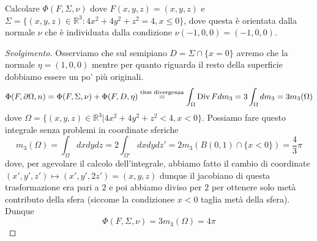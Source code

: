 \begin{example}
	Calcolare $\Phi(F, \Sigma, \nu)$ dove $F(x, y, z)=(x, y, z)$ e $\Sigma=\{(x, y, z) \in \mathbb{R}^3 : 4x^2 + 4y^2 + z^2 = 4, x \leq 0 \}$, dove questa è orientata dalla normale $\nu$ che è individuata dalla condizione
	$\nu(-1, 0, 0) = (-1, 0, 0)$.
\end{example}
\begin{proof}[Svolgimento]
	Osserviamo che sul semipiano $D = \Sigma \cap \{x = 0\}$ avremo che la normale $\eta = (1, 0, 0)$ mentre per quanto riguarda il resto della superficie dobbiamo essere un po' più originali.
	$$
	\Phi(F, \partial \Omega, n) = \Phi(F, \Sigma, \nu) + \Phi(F, D, \eta) \stackrel{\text{thm divergenza}}{=} \int_\Omega \operatorname{Div} F dm_3 = 3\int_\Omega dm_3 = 3m_3(\Omega) 
	$$
	dove $\Omega = \{(x, y, z) \in \mathbb{R}^3 | 4x^2 + 4y^2 + z^2 < 4, x < 0 \}$. Possiamo fare questo integrale senza problemi in coordinate sferiche
	$$
	m_3(\Omega) = \int_\Omega dxdydz = 2 \int_{\Omega'} dxdydz' = 2 m_3(B(0, 1) \cap \{ x < 0 \})= \frac{4}{3} \pi 
	$$
	dove, per agevolare il calcolo dell'integrale, abbiamo fatto il cambio di coordinate $(x', y', z') \mapsto (x', y', 2z') = (x, y, z)$ dunque il jacobiano di questa trasformazione era pari a $2$ e poi abbiamo diviso per $2$ per ottenere solo metà contributo della sfera (siccome la condizionee $x<0$ taglia metà della sfera).
	Dunque
	$$
	\Phi(F, \Sigma, \nu) = 3m_3(\Omega) = 4\pi
	$$
\end{proof}
